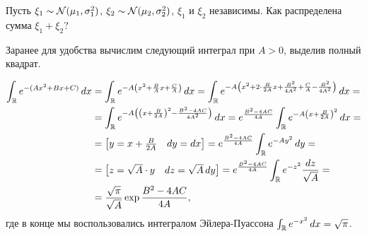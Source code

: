\documentclass[../main.tex]{subfiles}
\begin{document}
\begin{exmpl}
 \label{example:sum_of_two_independent_normal_rvs}
 Пусть $ \xi_1 \sim \mathcal N(\mu_1,\sigma_1^{2}) $, $ \xi_2 \sim\mathcal N(\mu_2,\sigma_2^{2}) $, $ \xi_1 $ и $ \xi_2 $ независимы. Как распределена сумма $ \xi_1 + \xi_2 $?

 Заранее для удобства вычислим следующий интеграл при $ A > 0 $, выделив полный квадрат.

 \begin{align*}
  \int_{\mathbb{R}} e^{-(Ax^{2} + Bx + C)} \,dx &= \int_{\mathbb{R}} e^{-A\left(x^{2} + \frac{B}{A}x + \frac{C}{A}\right)} \,dx = \int_{\mathbb{R}} e^{-A\left(x^{2} + 2 \cdot \frac{B}{2A} x + \frac{B^{2}}{4A^{2}} + \frac{C}{A} - \frac{B^{2}}{4A^{2}}\right)} \,dx = \\
  &= \int_{\mathbb{R}}  e^{-A \left( \left( x + \frac{B}{2A} \right)^{2} - \frac{B^{2}-4AC}{4A^{2}} \right)}\,dx = e^{\frac{B^{2}-4AC}{4A}} \int_{\mathbb{R}} e^{-A \left( x + \frac{B}{2A} \right)^{2}} \,dx = \\
  &= \begin{bmatrix}
   y = x + \frac{B}{2A} & dy = dx
  \end{bmatrix} = e^{\frac{B^{2}-4AC}{4A}} \int_{\mathbb{R}} e^{-Ay^{2}}\,dy  = \\
  &= \begin{bmatrix}
   z = \sqrt A \cdot y & dz = \sqrt A \, dy
  \end{bmatrix} = e^{\frac{B^{2}-4AC}{4A}} \int_{\mathbb{R}} e^{-z^{2}} \frac{dz}{\sqrt A} = \\
  &= \frac{\sqrt \pi}{\sqrt A} \exp \frac{B^{2}-4AC}{4A},
 \end{align*} где в конце мы воспользовались интегралом Эйлера-Пуассона $ \int_{\mathbb{R}} e^{-x^{2}}\,dx = \sqrt \pi  $.
 

\end{exmpl}
\end{document}
